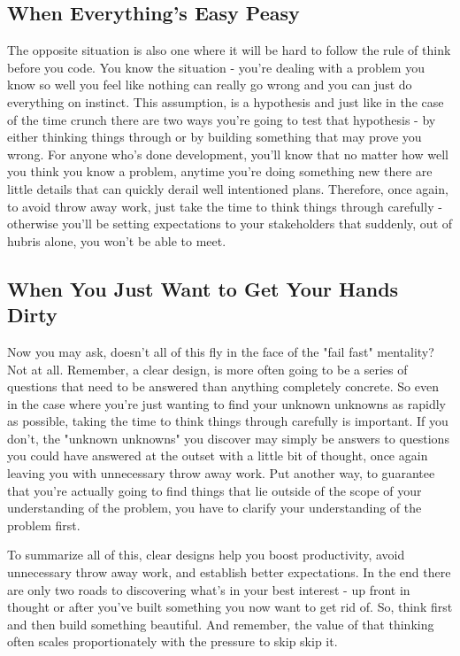 \documentclass[10pt,a5paper]{book}
\begin{document}
\subsection{When Everything's Easy Peasy}
The opposite situation is also one where it will be hard to follow the rule of think before you code. You know the situation - you're dealing with a problem you know so well you feel like nothing can really go wrong and you can just do everything on instinct. This assumption, is a hypothesis and just like in the case of the time crunch there are two ways you're going to test that hypothesis - by either thinking things through or by building something that may prove you wrong. For anyone who's done development, you'll know that no matter how well you think you know a problem, anytime you're doing something new there are little details that can quickly derail well intentioned plans. Therefore, once again, to avoid throw away work, just take the time to think things through carefully - otherwise you'll be setting expectations to your stakeholders that suddenly, out of hubris alone, you won't be able to meet. 

\subsection{When You Just Want to Get Your Hands Dirty}
Now you may ask, doesn't all of this fly in the face of the "fail fast" mentality? Not at all. Remember, a clear design, is more often going to be a series of questions that need to be answered than anything completely concrete. So even in the case where you're just wanting to find your unknown unknowns as rapidly as possible, taking the time to think things through carefully is important. If you don't, the "unknown unknowns" you discover may simply be answers to questions you could have answered at the outset with a little bit of thought, once again leaving you with unnecessary throw away work. Put another way, to guarantee that you're actually going to find things that lie outside of the scope of your understanding of the problem, you have to clarify your understanding of the problem first.

To summarize all of this, clear designs help you boost productivity, avoid unnecessary throw away work, and establish better expectations. In the end there are only two roads to discovering what's in your best interest - up front in thought or after you've built something you now want to get rid of. So, think first and then build something beautiful. And remember, the value of that thinking often scales proportionately with the pressure to skip skip it. 
\end{document}
